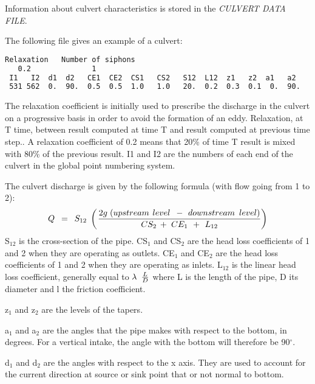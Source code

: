  Information about culvert characteristics is stored in the \textit{CULVERT DATA FILE}.

 The following file gives an example of a culvert:
\begin{lstlisting}[language=bash]
 Relaxation   Number of siphons
   0.2              1
 I1   I2  d1  d2   CE1  CE2  CS1   CS2   S12  L12  z1   z2  a1   a2
 531 562  0.  90.  0.5  0.5  1.0   1.0   20.  0.2  0.3  0.1  0.  90.
\end{lstlisting}
 The relaxation coefficient is initially used to prescribe the discharge in the culvert on a progressive basis in order to avoid the formation of an eddy. Relaxation, at T time, between result computed at time T and result computed at previous time step.. A relaxation coefficient of 0.2 means that 20\% of time T result is mixed with 80\% of the previous result. I1 and I2 are the numbers of each end of the culvert in the global point numbering system.

 The culvert discharge is given by the following formula (with flow going from 1 to 2):
\[Q{\kern 1pt} {\kern 1pt} {\kern 1pt} {\kern 1pt} {\kern 1pt} ={\kern 1pt} {\kern 1pt} {\kern 1pt} {\kern 1pt} {\kern 1pt} S_{12} {\kern 1pt} {\kern 1pt} {\kern 1pt} \left({\kern 1pt} \frac{2g{\kern 1pt} {\kern 1pt} {\kern 1pt} (upstream{\kern 1pt} {\kern 1pt} {\kern 1pt} {\kern 1pt} level{\kern 1pt} {\kern 1pt} {\kern 1pt} {\kern 1pt} {\kern 1pt} -{\kern 1pt} {\kern 1pt} {\kern 1pt} {\kern 1pt} downstream{\kern 1pt} {\kern 1pt} {\kern 1pt} {\kern 1pt} {\kern 1pt} level)}{CS_{2} {\kern 1pt} {\kern 1pt} +{\kern 1pt} {\kern 1pt} {\kern 1pt} CE_{1} {\kern 1pt} {\kern 1pt} {\kern 1pt} {\kern 1pt} +{\kern 1pt} {\kern 1pt} {\kern 1pt} {\kern 1pt} L_{12} } \right)\]
S${}_{12}$ is the cross-section of the pipe. CS${}_{1}$ and CS${}_{2}$ are the head loss coefficients of 1 and 2 when they are operating as outlets. CE${}_{1}$ and CE${}_{2}$ are the head loss coefficients of 1 and 2 when they are operating as inlets. L${}_{12}$ is the linear head loss coefficient, generally equal to $\lambda {\kern 1pt} {\kern 1pt} {\kern 1pt} {\kern 1pt} {\kern 1pt} \frac{L}{D} $ where L is the length of the pipe, D its diameter and l the friction coefficient.

 z${}_{1}$ and z${}_{2}$ are the levels of the tapers.

 a${}_{1}$ and a${}_{2}$ are the angles that the pipe makes with respect to the bottom, in degrees. For a vertical intake, the angle with the bottom will therefore be 90${}^\circ$.

 d${}_{1}$ and d${}_{2}$ are the angles with respect to the x axis. They are used to account for the current direction at source or sink point that or not normal to bottom.



